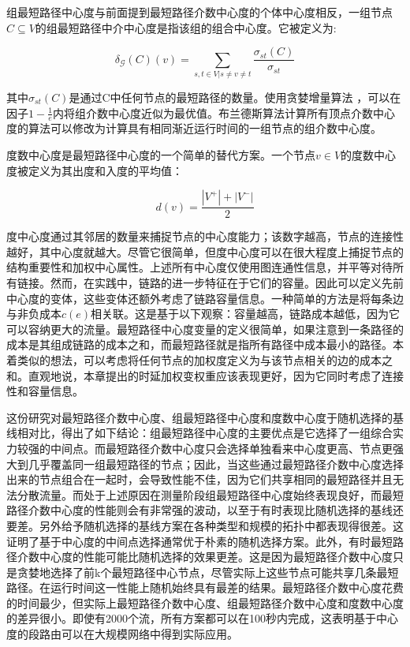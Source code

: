 组最短路径中心度与前面提到最短路径介数中心度的个体中心度相反，一组节点$C\subseteq V$的组最短路径中介中心度是指该组的组合中心度。它被定义为:

\begin{equation} \label{group shortest path centrality}
    \delta_\mathcal{G}(C)\left(v\right)=\sum_{s,t\in V|s\neq v\neq t}\frac{\sigma_{st}\left(C\right)}{\sigma_{st}}
\end{equation}

其中$\sigma_{st}\left(C\right)$是通过C中任何节点的最短路径的数量。使用贪婪增量算法 \cite{SRXXXX3} ，可以在因子$1-\frac{1}{e}$内将组介数中心度近似为最优值。布兰德斯算法计算所有顶点介数中心度的算法可以修改为计算具有相同渐近运行时间的一组节点的组介数中心度。

度数中心度是最短路径中心度的一个简单的替代方案。一个节点$v \in V$的度数中心度被定义为其出度和入度的平均值：

\begin{equation} \label{degrees of centre}
    d(v)=\frac{|V^+|+|V^-|}{2}
\end{equation}

度中心度通过其邻居的数量来捕捉节点的中心度能力；该数字越高，节点的连接性越好，其中心度就越大。尽管它很简单，但度中心度可以在很大程度上捕捉节点的结构重要性和加权中心属性。上述所有中心度仅使用图连通性信息，并平等对待所有链接。然而，在实践中，链路的进一步特征在于它们的容量。因此可以定义先前中心度的变体，这些变体还额外考虑了链路容量信息。一种简单的方法是将每条边与非负成本$c(e)$相关联。这是基于以下观察：容量越高，链路成本越低，因为它可以容纳更大的流量。最短路径中心度变量的定义很简单，如果注意到一条路径的成本是其组成链路的成本之和，而最短路径就是指所有路径中成本最小的路径。本着类似的想法，可以考虑将任何节点的加权度定义为与该节点相关的边的成本之和。直观地说，本章提出的时延加权变权重应该表现更好，因为它同时考虑了连接性和容量信息。

这份研究对最短路径介数中心度、组最短路径中心度和度数中心度于随机选择的基线相对比，得出了如下结论：组最短路径中心度的主要优点是它选择了一组综合实力较强的中间点。而最短路径介数中心度只会选择单独看来中心度更高、节点更强大到几乎覆盖同一组最短路径的节点；因此，当这些通过最短路径介数中心度选择出来的节点组合在一起时，会导致性能不佳，因为它们共享相同的最短路径并且无法分散流量。而处于上述原因在测量阶段组最短路径中心度始终表现良好，而最短路径介数中心度的性能则会有非常强的波动，以至于有时表现比随机选择的基线还要差。另外给予随机选择的基线方案在各种类型和规模的拓扑中都表现得很差。这证明了基于中心度的中间点选择通常优于朴素的随机选择方案。此外，有时最短路径介数中心度的性能可能比随机选择的效果更差。这是因为最短路径介数中心度只是贪婪地选择了前k个最短路径中心节点，尽管实际上这些节点可能共享几条最短路径。在运行时间这一性能上随机始终具有最差的结果。最短路径介数中心度花费的时间最少，但实际上最短路径介数中心度、组最短路径介数中心度和度数中心度的差异很小。即使有2000个流，所有方案都可以在100秒内完成，这表明基于中心度的段路由可以在大规模网络中得到实际应用。

